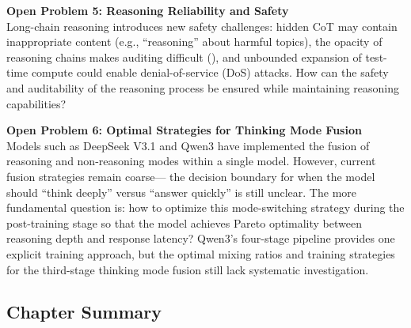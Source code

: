 \begin{openproblembox}
\textbf{Open Problem 5: Reasoning Reliability and Safety}\\
Long-chain reasoning introduces new safety challenges:
hidden CoT may contain inappropriate content (e.g., ``reasoning'' about harmful topics),
the opacity of reasoning chains makes auditing difficult
(),
and unbounded expansion of test-time compute could enable denial-of-service (DoS) attacks.
How can the safety and auditability of the reasoning process be ensured while maintaining reasoning capabilities?
\end{openproblembox}

\begin{openproblembox}
\textbf{Open Problem 6: Optimal Strategies for Thinking Mode Fusion}\\
Models such as DeepSeek V3.1 and Qwen3 \cite{yang2025qwen3} have implemented
the fusion of reasoning and non-reasoning modes within a single model.
However, current fusion strategies remain coarse---
the decision boundary for when the model should ``think deeply'' versus ``answer quickly'' is still unclear.
The more fundamental question is:
how to optimize this mode-switching strategy during the post-training stage
so that the model achieves Pareto optimality between reasoning depth and response latency?
Qwen3's four-stage pipeline provides one explicit training approach,
but the optimal mixing ratios and training strategies for the third-stage thinking mode fusion
still lack systematic investigation.
\end{openproblembox}

\subsection{Chapter Summary}

